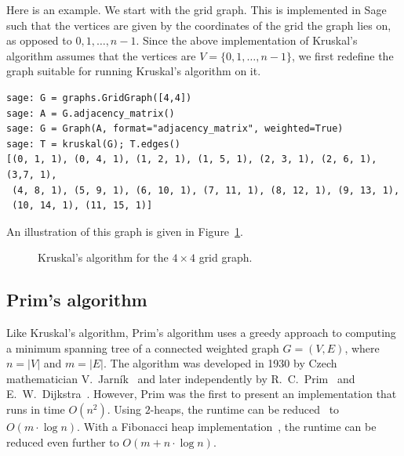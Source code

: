Here is an example. We start with the grid
graph. This is implemented in Sage such that the vertices are given by
the coordinates of the grid the graph lies on, as opposed to
$0, 1, \dots, n-1$. Since the above implementation of
Kruskal's algorithm assumes that the
vertices are $V = \{0, 1, \dots, n-1\}$, we first redefine the graph
suitable for running Kruskal's algorithm on
it.
\begin{lstlisting}
sage: G = graphs.GridGraph([4,4])
sage: A = G.adjacency_matrix()
sage: G = Graph(A, format="adjacency_matrix", weighted=True)
sage: T = kruskal(G); T.edges()
[(0, 1, 1), (0, 4, 1), (1, 2, 1), (1, 5, 1), (2, 3, 1), (2, 6, 1), (3,7, 1),
 (4, 8, 1), (5, 9, 1), (6, 10, 1), (7, 11, 1), (8, 12, 1), (9, 13, 1),
 (10, 14, 1), (11, 15, 1)]
\end{lstlisting}
An illustration of this graph is given in
Figure~\ref{fig:trees-forests:Kruskal_example}.

\begin{figure}[!htbp]
\centering
{}

\caption{Kruskal's algorithm for the $4 \times 4$ grid graph.}
\label{fig:trees-forests:Kruskal_example}
\end{figure}



\subsection{Prim's algorithm}
\label{subsec:trees_forests:Prim_algorithm}

Like Kruskal's algorithm,
Prim's algorithm uses a
greedy approach to computing a
minimum spanning tree of a connected
weighted graph $G = (V,E)$, where $n = |V|$ and
$m = |E|$. The algorithm was developed in 1930 by Czech mathematician
V.~Jarn\'ik~\cite{Jarnik1930} and later
independently by R.~C.~Prim~\cite{Prim1957} and
E.~W.~Dijkstra~\cite{Dijkstra1959}. However,
Prim was the first to present an implementation
that runs in time $O(n^2)$. Using $2$-heaps, the
runtime can be reduced~\cite{KershenbaumVanSlyke1972} to
$O(m \cdot \log n)$. With a Fibonacci heap
implementation~\cite{FredmanTarjan1984,FredmanTarjan1987}, the runtime
can be reduced even further to $O(m + n \cdot \log n)$.

